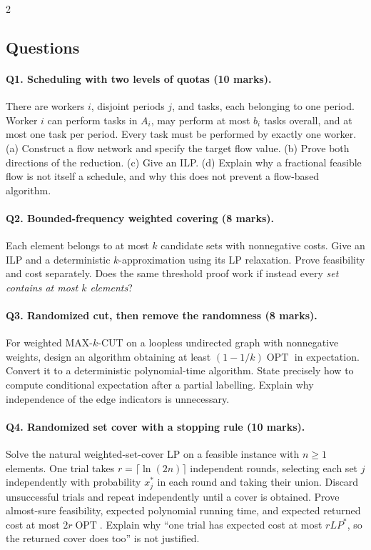 \documentclass[8pt]{extarticle}
\theoremstyle{definition}
\newcommand{\OPT}{\operatorname{OPT}}
\begin{document}
\begin{multicols*}{2}
\subsection{Questions}
\paragraph{Q1. Scheduling with two levels of quotas (10 marks).}
There are workers $i$, disjoint periods $j$, and tasks, each belonging to
one period.  Worker $i$ can perform tasks in $A_i$, may perform at most
$b_i$ tasks overall, and at most one task per period.  Every task must be
performed by exactly one worker.
(a) Construct a flow network and specify the target flow value.
(b) Prove both directions of the reduction.  (c) Give an ILP.
(d) Explain why a fractional feasible flow is not itself a schedule, and
why this does not prevent a flow-based algorithm.

\paragraph{Q2. Bounded-frequency weighted covering (8 marks).}
Each element belongs to at most $k$ candidate sets with nonnegative costs.
Give an ILP and a deterministic $k$-approximation using its LP relaxation.
Prove feasibility and cost separately.  Does the same threshold proof work
if instead every \emph{set contains at most $k$ elements}?

\paragraph{Q3. Randomized cut, then remove the randomness (8 marks).}
For weighted MAX-$k$-CUT on a loopless undirected graph with nonnegative
weights, design an algorithm obtaining at least $(1-1/k)\OPT$ in expectation.
Convert it to a deterministic polynomial-time algorithm.  State precisely
how to compute conditional expectation after a partial labelling.  Explain
why independence of the edge indicators is unnecessary.

\paragraph{Q4. Randomized set cover with a stopping rule (10 marks).}
Solve the natural weighted-set-cover LP on a feasible instance with $n\ge1$
elements.  One trial takes $r=\lceil\ln(2n)\rceil$ independent rounds,
selecting each set $j$ independently with probability $x_j^*$ in each round
and taking their union.  Discard unsuccessful trials and repeat independently
until a cover is obtained.  Prove almost-sure feasibility, expected polynomial
running time, and expected returned cost at most $2r\OPT$.  Explain why
``one trial has expected cost at most $rLP^*$, so the returned cover does
too'' is not justified.


\end{multicols*}
\end{document}
